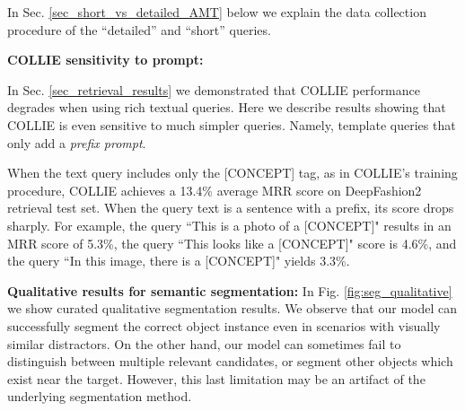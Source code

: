 \documentclass[runningheads]{llncs}
\newcommand{\secref}[1]{Sec. \ref{#1}}
\newcommand{\concept}{[CONCEPT]}
\begin{document}
In \secref{sec_short_vs_detailed_AMT} below we explain the data collection procedure of the ``detailed'' and ``short'' queries.

\vspace{15pt}\noindent\textbf{COLLIE sensitivity to prompt:}

In \secref{sec_retrieval_results} we demonstrated that COLLIE performance degrades when using rich textual queries. Here we describe results showing that COLLIE is even sensitive to much simpler queries. Namely, template queries that only add a \textit{prefix prompt}.

When the text query includes only the \concept{} tag, as in COLLIE's training procedure, COLLIE achieves a 13.4\% average MRR score on DeepFashion2 retrieval test set. When the query text is a sentence with a prefix, its score drops sharply. For example, the query ``This is a photo of a \concept{}" results in an MRR score of 5.3\%,  the query ``This looks like a \concept{}" score is 4.6\%, and the query ``In this image, there is a \concept{}" yields 3.3\%.


\vspace{15pt}\noindent\textbf{Qualitative results for semantic segmentation:}
In Fig. \ref{fig:seg_qualitative} we show curated qualitative segmentation results. 
We observe that our model can successfully segment the correct object instance even in scenarios with visually similar distractors. On the other hand, our model can sometimes fail to distinguish between multiple relevant candidates, or segment other objects which exist near the target. However, this last limitation may be an artifact of the underlying segmentation method. 
\end{document}
